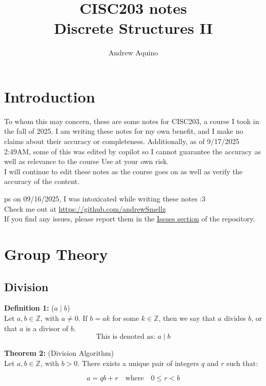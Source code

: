\documentclass[12pt]{article}
\title{CISC203 notes\\Discrete Structures II}
\author{Andrew Aquino}
\date{}
\begin{document}
\maketitle

\section*{Introduction}

To whom this may concern, these are some notes for CISC203, 
a course I took in the fall of 2025. 
I am writing these notes for my own benefit, 
and I make no claims about their accuracy or completeness. 
Additionally, as of 9/17/2025 2:49AM, some of this was edited by copilot so I cannot guarantee the accuracy as well as relevance to the course
Use at your own risk.
\\
I will continue to edit these notes as the course goes on as well as verify the accuracy of the content.


ps on 09/16/2025, I was intoxicated while writing these notes :3
\\
Check me out at \url{https://github.com/andrewSmellz}
\\
If you find any issues, please report them in the \href{https://github.com/andrewSmellz/cisc203/issues}{Issues section} of the repository.


\tableofcontents
\newpage

\section{Group Theory}

\subsection{Division}

\noindent\textbf{Definition 1:} ($a \mid b$) 
\label{def:divides}
\\Let $a, b \in \mathbb{Z}$, with $a \neq 0$.  
If $b = ak$ for some $k \in \mathbb{Z}$, then we say that $a$ divides $b$,  
or that $a$ is a divisor of $b$. 
\[\text{This is denoted as: } a \mid b\]

\vspace{5mm}

\noindent\textbf{Theorem 2:} (Division Algorithm) 
\label{thm:division}
\\Let $a, b \in \mathbb{Z}$, with $b > 0$.  
There exists a unique pair of integers $q$ and $r$ such that:

\[
a = qb + r \quad \text{where} \quad 0 \leq r < b
\]
\end{document}
